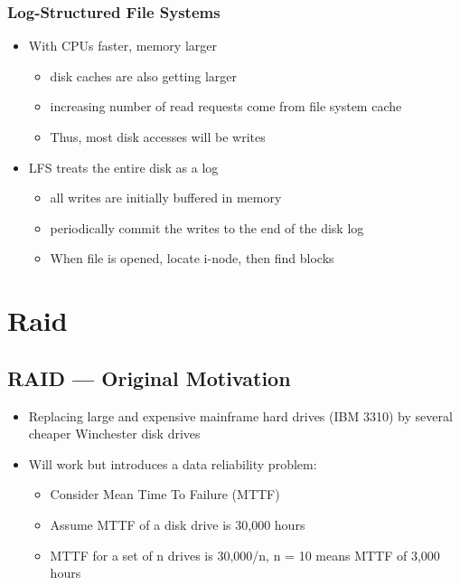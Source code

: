 \documentclass[12pt]{article}
\begin{document}
\subsubsection{Log-Structured File Systems}
\begin{itemize}
    \item With CPUs faster, memory larger \begin{itemize}
        \item disk caches are also getting larger 
        \item increasing number of read requests come from file system cache 
        \item Thus, most disk accesses will be writes
    \end{itemize}
    \item LFS treats the entire disk as a log \begin{itemize}
        \item all writes are initially buffered in memory 
        \item periodically commit the writes to the end of the disk log 
        \item When file is opened, locate i-node, then find blocks
    \end{itemize}
\end{itemize}

\section{Raid}
\subsection{RAID — Original Motivation}
\begin{itemize}
    \item Replacing large and expensive mainframe hard drives (IBM 3310) by several cheaper Winchester disk drives 
    \item Will work but introduces a data reliability problem: \begin{itemize}
        \item Consider Mean Time To Failure (MTTF) 
        \item Assume MTTF of a disk drive is 30,000 hours 
        \item MTTF for a set of n drives is 30,000/n, n = 10 means MTTF of 3,000 hours
    \end{itemize}
\end{itemize}
\end{document}
